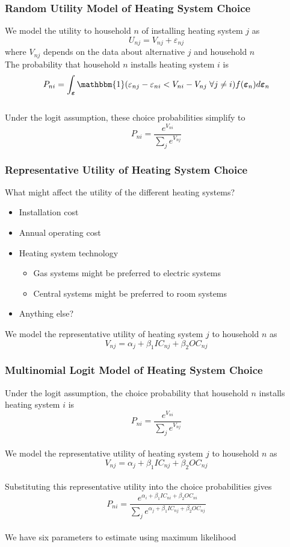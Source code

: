 \documentclass{beamer}\usepackage[]{graphicx}\usepackage[]{xcolor}
\begin{document}
\begin{frame}\frametitle{Random Utility Model of Heating System Choice}
    We model the utility to household $n$ of installing heating system $j$ as
    $$U_{nj} = V_{nj} + \varepsilon_{nj}$$
    where $V_{nj}$ depends on the data about alternative $j$ and household $n$ \\
    \vspace{3ex}
    The probability that household $n$ installs heating system $i$ is
 	$$P_{ni} = \int_{\bm{\varepsilon}} \mathbbm{1}(\varepsilon_{nj} - \varepsilon_{ni} < V_{ni} - V_{nj} \; \forall j \neq i) f(\bm{\varepsilon}_n) d\bm{\varepsilon}_n$$ \\
 	\vspace{2ex}
  	Under the logit assumption, these choice probabilities simplify to
    $$P_{ni} = \frac{e^{V_{ni}}}{\sum_j e^{V_{nj}}}$$
\end{frame}

\begin{frame}\frametitle{Representative Utility of Heating System Choice}
	What might affect the utility of the different heating systems?
	\begin{itemize}
		\item Installation cost
		\item Annual operating cost
		\item Heating system technology
		\begin{itemize}
			\item Gas systems might be preferred to electric systems
			\item Central systems might be preferred to room systems
		\end{itemize}
		\item Anything else?
	\end{itemize}
    \vspace{3ex}
    We model the representative utility of heating system $j$ to household $n$ as
    $$V_{nj} = \alpha_j + \beta_1 IC_{nj} + \beta_2 OC_{nj}$$
\end{frame}

\begin{frame}\frametitle{Multinomial Logit Model of Heating System Choice}
    Under the logit assumption, the choice probability that household $n$ installs heating system $i$ is
    $$P_{ni} = \frac{e^{V_{ni}}}{\sum_j e^{V_{nj}}}$$ \\
    \vspace{1ex}
    We model the representative utility of heating system $j$ to household $n$ as
    $$V_{nj} = \alpha_j + \beta_1 IC_{nj} + \beta_2 OC_{nj}$$ \\
    \vspace{1ex}
    Substituting this representative utility into the choice probabilities gives
    $$P_{ni} = \frac{e^{\alpha_i + \beta_1 IC_{ni} + \beta_2 OC_{ni}}}{\sum_j e^{\alpha_j + \beta_1 IC_{nj} + \beta_2 OC_{nj}}}$$ \\
    \vspace{1ex}
    We have six parameters to estimate using maximum likelihood
\end{frame}
\end{document}
